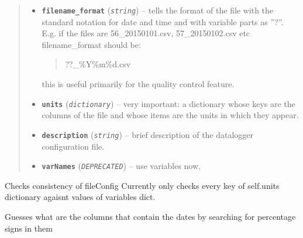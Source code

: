 \documentclass[a4paper,10pt,oneside]{sphinxmanual}
\begin{document}
\begin{fulllineitems}
\begin{quote}
\begin{description}
\begin{itemize}
\item {} 
\textbf{\texttt{filename\_format}} (\emph{\texttt{string}}) -- 
tells the format of the file with the standard notation for date and time and with variable
parts as ''?''. E.g. if the files are 56\_20150101.csv, 57\_20150102.csv etc filename\_format should be:
\begin{quote}

??\_\%Y\%m\%d.csv
\end{quote}

this is useful primarily for the quality control feature.


\item {} 
\textbf{\texttt{units}} (\emph{\texttt{dictionary}}) -- very important: a dictionary whose keys are the columns of the file and whose items are
the units in which they appear.

\item {} 
\textbf{\texttt{description}} (\emph{\texttt{string}}) -- brief description of the datalogger configuration file.

\item {} 
\textbf{\texttt{varNames}} (\emph{\texttt{DEPRECATED}}) -- use variables now.

\end{itemize}

\end{description}\end{quote}

\begin{fulllineitems}
\label{pymicra:pymicra.core.fileConfig.check_consistency}
Checks consistency of fileConfig
Currently only checks every key of self.units dictionary agaisnt values of variables dict.

\end{fulllineitems}


\begin{fulllineitems}
\label{pymicra:pymicra.core.fileConfig.get_date_cols}
Guesses what are the columns that contain the dates by searching
for percentage signs in them

\end{fulllineitems}


\end{fulllineitems}
\end{document}
